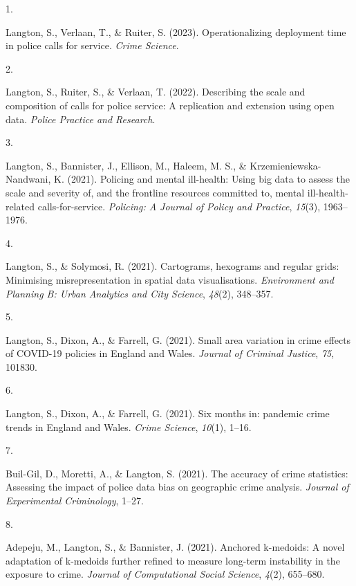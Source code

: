 \documentclass[10pt,a4paper,]{article}
\newlength{\cslhangindent}
\newlength{\csllabelwidth}
\newenvironment{CSLReferences}[2] %
 {\begin{list}{}{%
  \setlength{\itemindent}{0pt}
  \setlength{\leftmargin}{0pt}
  \setlength{\parsep}{0pt}
  \ifodd #1
   \setlength{\leftmargin}{\cslhangindent}
   \setlength{\itemindent}{-1\cslhangindent}
  \fi
  \setlength{\itemsep}{#2\baselineskip}}}
 {\end{list}}
\newcommand{\CSLLeftMargin}[1]{\parbox[t]{\csllabelwidth}{\strut#1\strut}}
\newcommand{\CSLRightInline}[1]{\parbox[t]{\linewidth - \csllabelwidth}{\strut#1\strut}}
\begin{document}
\hypertarget{refs-018106d21508b671268fb512e33aaec1}{}
\begin{CSLReferences}{0}{0}
\leavevmode{}%
\CSLLeftMargin{1. }%
\CSLRightInline{Langton, S., Verlaan, T., \& Ruiter, S. (2023).
Operationalizing deployment time in police calls for service.
\emph{Crime Science}.}

\leavevmode{}%
\CSLLeftMargin{2. }%
\CSLRightInline{Langton, S., Ruiter, S., \& Verlaan, T. (2022).
Describing the scale and composition of calls for police service: A
replication and extension using open data. \emph{Police Practice and
Research}.}

\leavevmode{}%
\CSLLeftMargin{3. }%
\CSLRightInline{Langton, S., Bannister, J., Ellison, M., Haleem, M. S.,
\& Krzemieniewska-Nandwani, K. (2021). Policing and mental ill-health:
Using big data to assess the scale and severity of, and the frontline
resources committed to, mental ill-health-related calls-for-service.
\emph{Policing: A Journal of Policy and Practice}, \emph{15}(3),
1963--1976.}

\leavevmode{}%
\CSLLeftMargin{4. }%
\CSLRightInline{Langton, S., \& Solymosi, R. (2021). Cartograms,
hexograms and regular grids: Minimising misrepresentation in spatial
data visualisations. \emph{Environment and Planning B: Urban Analytics
and City Science}, \emph{48}(2), 348--357.}

\leavevmode{}%
\CSLLeftMargin{5. }%
\CSLRightInline{Langton, S., Dixon, A., \& Farrell, G. (2021). Small
area variation in crime effects of COVID-19 policies in England and
Wales. \emph{Journal of Criminal Justice}, \emph{75}, 101830.}

\leavevmode{}%
\CSLLeftMargin{6. }%
\CSLRightInline{Langton, S., Dixon, A., \& Farrell, G. (2021). Six
months in: pandemic crime trends in England and Wales. \emph{Crime
Science}, \emph{10}(1), 1--16.}

\leavevmode{}%
\CSLLeftMargin{7. }%
\CSLRightInline{Buil-Gil, D., Moretti, A., \& Langton, S. (2021). The
accuracy of crime statistics: Assessing the impact of police data bias
on geographic crime analysis. \emph{Journal of Experimental
Criminology}, 1--27.}

\leavevmode{}%
\CSLLeftMargin{8. }%
\CSLRightInline{Adepeju, M., Langton, S., \& Bannister, J. (2021).
Anchored k-medoids: A novel adaptation of k-medoids further refined to
measure long-term instability in the exposure to crime. \emph{Journal of
Computational Social Science}, \emph{4}(2), 655--680.}


\end{CSLReferences}
\end{document}
